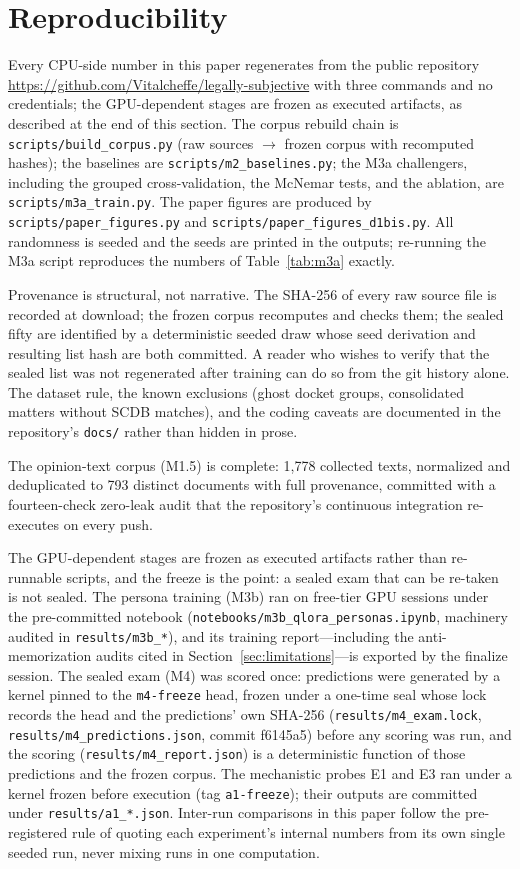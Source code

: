 \section{Reproducibility}\label{sec:repro}

Every CPU-side number in this paper regenerates from the public repository
\url{https://github.com/Vitalcheffe/legally-subjective} with three commands
and no credentials; the GPU-dependent stages are frozen as executed
artifacts, as described at the end of this section. The corpus rebuild chain is
\texttt{scripts/build\_corpus.py} (raw sources $\rightarrow$
frozen corpus with recomputed hashes); the baselines are
\texttt{scripts/m2\_baselines.py}; the M3a challengers, including
the grouped cross-validation, the McNemar tests, and the ablation,
are \texttt{scripts/m3a\_train.py}. The paper figures are produced
by \texttt{scripts/paper\_figures.py} and
\texttt{scripts/paper\_figures\_d1bis.py}. All randomness is seeded and
the seeds are printed in the outputs; re-running the M3a script
reproduces the numbers of Table~\ref{tab:m3a} exactly.

Provenance is structural, not narrative. The SHA-256 of every raw
source file is recorded at download; the frozen corpus recomputes
and checks them; the sealed fifty are identified by a
deterministic seeded draw whose seed derivation and resulting list
hash are both committed. A reader who wishes to verify that the
sealed list was not regenerated after training can do so from the
git history alone. The dataset rule, the known exclusions
(ghost docket groups, consolidated matters without SCDB matches),
and the coding caveats are documented in the repository's
\texttt{docs/} rather than hidden in prose.

The opinion-text corpus (M1.5) is complete: 1{,}778 collected texts,
normalized and deduplicated to 793 distinct documents with full
provenance, committed with a fourteen-check zero-leak audit that the
repository's continuous integration re-executes on every push.

The GPU-dependent stages are frozen as executed artifacts rather
than re-runnable scripts, and the freeze is the point: a sealed exam
that can be re-taken is not sealed. The persona training (M3b) ran
on free-tier GPU sessions under the pre-committed notebook
(\texttt{notebooks/m3b\_qlora\_personas.ipynb}, machinery audited in
\texttt{results/m3b\_*}), and its training report---including the
anti-memorization audits cited in
Section~\ref{sec:limitations}---is exported by the finalize session.
The sealed exam (M4) was scored once: predictions were generated by
a kernel pinned to the \texttt{m4-freeze} head, frozen under a
one-time seal whose lock records the head and the predictions' own
SHA-256 (\texttt{results/m4\_exam.lock},
\texttt{results/m4\_predictions.json}, commit f6145a5) before any
scoring was run, and the scoring
(\texttt{results/m4\_report.json}) is a deterministic function of
those predictions and the frozen corpus. The mechanistic probes E1
and E3 ran under a kernel frozen before execution (tag
\texttt{a1-freeze}); their outputs are committed under
\texttt{results/a1\_*.json}. Inter-run comparisons in this paper
follow the pre-registered rule of quoting each experiment's internal
numbers from its own single seeded run, never mixing runs in one
computation.
